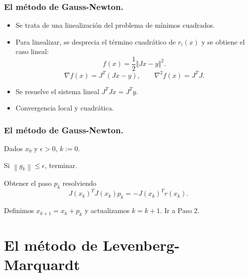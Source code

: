 \documentclass{beamer}
\newcommand{\norm}[1]{\left\lVert#1\right\rVert}
\begin{document}
\begin{frame}
    \frametitle{El método de Gauss-Newton.}\pause
    \begin{itemize}[label=\textbullet]
        \item Se trata de una linealización del problema de mínimos cuadrados. \pause
        \item Para linealizar, se desprecia el término cuadrático de $r_i(x)$ y se obtiene el caso lineal:
        \begin{equation*}
            f(x) = \frac{1}{2} \Vert Jx-y \Vert^2.
        \end{equation*}
        \begin{equation*}
            \nabla f(x) = J^T(Jx-y), \qquad \nabla^2 f(x) =  J^TJ.
        \end{equation*}
        \pause
        \item Se resuelve el sistema lineal $J^TJx = J^Ty$. \pause
        \item Convergencia local y cuadrática.
    \end{itemize}
\end{frame}

\begin{frame}
    \frametitle{El método de Gauss-Newton.}
    \begin{steps}
        \item Dados $x_0$ y $\epsilon > 0$, $k:=0$.
        \item Si $\norm{g_k} \leq \epsilon$, terminar.
        \item Obtener el paso $p_k$ resolviendo
            \begin{equation}
                J(x_k)^TJ(x_k)p_k = -J(x_k)^Tr(x_k).
            \end{equation}
        \item Definimos $x_{k+1} = x_k + p_k$ y actualizamos $k=k+1$. Ir a Paso 2.
    \end{steps}

\end{frame}


\section{El método de Levenberg-Marquardt}
\end{document}
